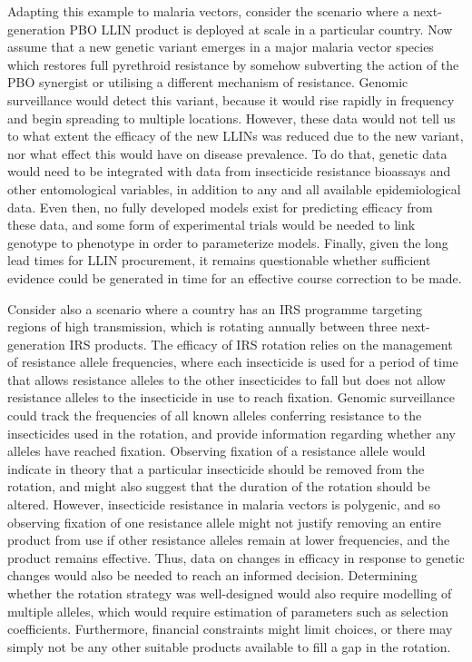 \begin{refsection}
Adapting this example to malaria vectors, consider the scenario where a next-generation PBO LLIN product is deployed at scale in a particular country.
%
Now assume that a new genetic variant emerges in a major malaria vector species which restores full pyrethroid resistance by somehow subverting the action of the PBO synergist or utilising a different mechanism of resistance.
%
Genomic surveillance would detect this variant, because it would rise rapidly in frequency and begin spreading to multiple locations.
%
However, these data would not tell us to what extent the efficacy of the new LLINs was reduced due to the new variant, nor what effect this would have on disease prevalence.
%
To do that, genetic data would need to be integrated with data from insecticide resistance bioassays and other entomological variables, in addition to any and all available epidemiological data.
%
Even then, no fully developed models exist for predicting efficacy from these data, and some form of experimental trials would be needed to link genotype to phenotype in order to parameterize models.
%
Finally, given the long lead times for LLIN procurement, it remains questionable whether sufficient evidence could be generated in time for an effective course correction to be made.


Consider also a scenario where a country has an IRS programme targeting regions of high transmission, which is rotating annually between three next-generation IRS products.
%
The efficacy of IRS rotation relies on the management of resistance allele frequencies, where each insecticide is used for a period of time that allows resistance alleles to the other insecticides to fall but does not allow resistance alleles to the insecticide in use to reach fixation.
%
Genomic surveillance could track the frequencies of all known alleles conferring resistance to the insecticides used in the rotation, and provide information regarding whether any alleles have reached fixation.
%
Observing fixation of a resistance allele would indicate in theory that a particular insecticide should be removed from the rotation, and might also suggest that the duration of the rotation should be altered.
%
However, insecticide resistance in malaria vectors is polygenic, and so observing fixation of one resistance allele might not justify removing an entire product from use if other resistance alleles remain at lower frequencies, and the product remains effective.
%
Thus, data on changes in efficacy in response to genetic changes would also be needed to reach an informed decision.
%
Determining whether the rotation strategy was well-designed would also require modelling of multiple alleles, which would require estimation of parameters such as selection coefficients.
%
Furthermore, financial constraints might limit choices, or there may simply not be any other suitable products available to fill a gap in the rotation.



\end{refsection}
